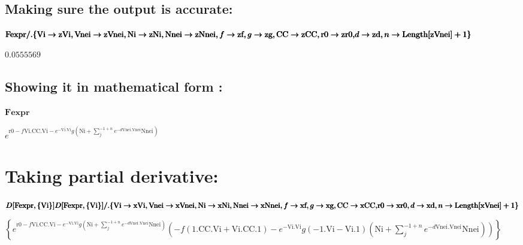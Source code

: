 \documentclass{article}
\begin{document}
\subsection*{Making sure the output is accurate:}

\begin{doublespace}
\noindent\(\pmb{\text{Fexpr} \text{/.} \{\text{Vi}\to \text{zVi},\text{Vnei}\to \text{zVnei},\text{Ni}\to \text{zNi},\text{Nnei}\to \text{zNnei},f\to \text{zf},g\to \text{zg},\text{CC}\to \text{zCC},\text{r0}\to \text{zr0},}\\
\pmb{d\to \text{zd}, n \to  \text{Length}[\text{zVnei}] + 1\}}\)
\end{doublespace}

\begin{doublespace}
\noindent\(0.0555569\)
\end{doublespace}

\subsection*{Showing it in mathematical form :}

\begin{doublespace}
\noindent\(\pmb{\text{Fexpr}}\)
\end{doublespace}

\begin{doublespace}
\noindent\(e^{\text{r0}-f \text{Vi}.\text{CC}.\text{Vi}-e^{-\text{Vi}.\text{Vi}} g \left(\text{Ni}+\sum _j^{-1+n} e^{-d \text{Vnei}_{}.\text{Vnei}_{}} \text{Nnei}_{}\right)}\)
\end{doublespace}

\section*{Taking partial derivative:}

\begin{doublespace}
\noindent\(\pmb{D[\text{Fexpr}, \{\text{Vi}\}]}\\
\pmb{D[\text{Fexpr}, \{\text{Vi}\}] \text{/.} \{\text{Vi}\to \text{xVi},\text{Vnei}\to \text{xVnei},\text{Ni}\to \text{xNi},\text{Nnei}\to \text{xNnei},f\to \text{xf},g\to \text{xg},\text{CC}\to \text{xCC},}\\
\pmb{\text{r0}\to \text{xr0},d\to \text{xd}, n \to  \text{Length}[\text{xVnei}] + 1\}}\)
\end{doublespace}

\begin{doublespace}
\noindent\(\left\{e^{\text{r0}-f \text{Vi}.\text{CC}.\text{Vi}-e^{-\text{Vi}.\text{Vi}} g \left(\text{Ni}+\sum _j^{-1+n} e^{-d \text{Vnei}_{}.\text{Vnei}_{}} \text{Nnei}_{}\right)} \left(-f (1.\text{CC}.\text{Vi}+\text{Vi}.\text{CC}.1)-e^{-\text{Vi}.\text{Vi}} g (-1.\text{Vi}-\text{Vi}.1) \left(\text{Ni}+\sum _j^{-1+n} e^{-d \text{Vnei}_{}.\text{Vnei}_{}} \text{Nnei}_{}\right)\right)\right\}\)
\end{doublespace}
\end{document}
